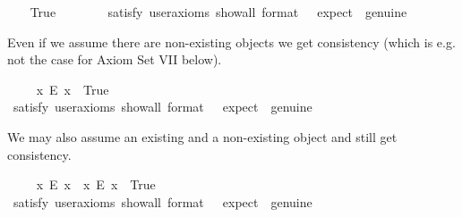 \begin{isabellebody}
\ \ \isamarkupfalse%
\ True\ \ %
\isanewline
\ \ \ \ \isamarkupfalse%
\ {\isacharbrackleft}satisfy{\isacharcomma}\ user{\isacharunderscore}axioms{\isacharcomma}\ show{\isacharunderscore}all{\isacharcomma}\ format\ {\isacharequal}\ {}{\isacharcomma}\ expect\ {\isacharequal}\ genuine{\isacharbrackright}%
\isadelimproof
\ %
\endisadelimproof
%
\isatagproof
{}\isamarkupfalse%
%
\endisatagproof
{\isafoldproof}%
%
\isadelimproof
%
\endisadelimproof
%
\begin{isamarkuptext}%
Even if we assume there are non-existing objects we get consistency (which is e.g. not the
case for Axiom Set VII below).%
\end{isamarkuptext}\isamarkuptrue%
\ \ \isamarkupfalse%
\ \ {\isachardoublequoteopen}{\isasymexists}x{\isachardot}\ \isactrlbold {\isasymnot}{\isacharparenleft}E\ x{\isacharparenright}{\isachardoublequoteclose}\ \ True\ \ %
\ \isanewline
\ \ \ \ \isamarkupfalse%
\ {\isacharbrackleft}satisfy{\isacharcomma}\ user{\isacharunderscore}axioms{\isacharcomma}\ show{\isacharunderscore}all{\isacharcomma}\ format\ {\isacharequal}\ {}{\isacharcomma}\ expect\ {\isacharequal}\ genuine{\isacharbrackright}%
\isadelimproof
\ %
\endisadelimproof
%
\isatagproof
{}\isamarkupfalse%
%
\endisatagproof
{\isafoldproof}%
%
\isadelimproof
%
\endisadelimproof
%
\begin{isamarkuptext}%
We may also assume an existing and a non-existing object and still get consistency.%
\end{isamarkuptext}\isamarkuptrue%
\ \ \isamarkupfalse%
\ \ {\isachardoublequoteopen}{\isacharparenleft}{\isasymexists}x{\isachardot}\ \isactrlbold {\isasymnot}{\isacharparenleft}E\ x{\isacharparenright}{\isacharparenright}\ {\isasymand}\ {\isacharparenleft}{\isasymexists}x{\isachardot}\ {\isacharparenleft}E\ x{\isacharparenright}{\isacharparenright}{\isachardoublequoteclose}\ \ True\ \ %
\ \isanewline
\ \ \ \ \isamarkupfalse%
\ {\isacharbrackleft}satisfy{\isacharcomma}\ user{\isacharunderscore}axioms{\isacharcomma}\ show{\isacharunderscore}all{\isacharcomma}\ format\ {\isacharequal}\ {}{\isacharcomma}\ expect\ {\isacharequal}\ genuine{\isacharbrackright}%

\end{isabellebody}
